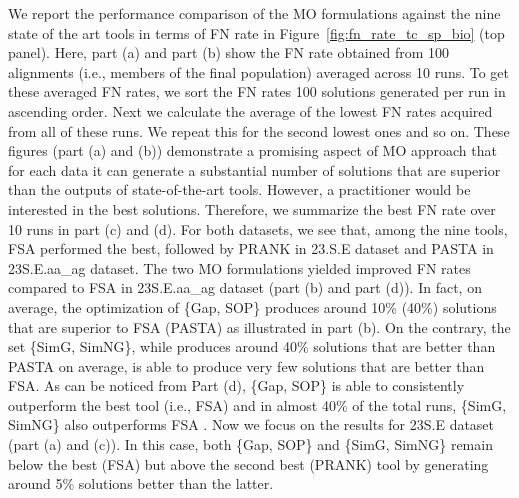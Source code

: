 We report the performance comparison of the MO formulations against the nine state of the art tools in terms of FN rate in Figure~\ref{fig:fn_rate_tc_sp_bio} (top panel). Here, part (a) and part (b) show the FN rate obtained from 100 alignments (i.e., members of the final population) averaged across 10 runs. To get these averaged FN rates, we sort the FN rates 100 solutions generated per run in ascending order. Next we calculate the average of the lowest FN rates acquired from all of these runs. We repeat this for the second lowest ones and so on. These figures (part (a) and (b)) demonstrate a promising aspect of MO approach that for each data it can generate a substantial number of solutions that are superior than the outputs of state-of-the-art tools. However, a practitioner would be interested in the best solutions. Therefore, we summarize the best FN rate over 10 runs in part (c) and (d). For both datasets, we see that, among the nine tools, FSA performed the best, followed by PRANK in 23.S.E dataset and PASTA in 23S.E.aa\_ag dataset. The two MO formulations yielded improved FN rates compared to FSA in 23S.E.aa\_ag dataset (part (b) and part (d)). In fact, on average, the optimization of \{Gap, SOP\} produces around 10\% (40\%) solutions that are superior to FSA (PASTA) as illustrated in part (b). On the contrary, the set \{SimG, SimNG\}, while produces around 40\% solutions that are better than PASTA on average, is able to produce very few solutions that are better than FSA. As can be noticed from Part (d), \{Gap, SOP\} is able to consistently outperform the best tool (i.e., FSA) and in almost 40\% of the total runs, \{SimG, SimNG\} also outperforms FSA . Now we focus on the results for 23S.E dataset (part (a) and (c)).  In this case, both \{Gap, SOP\} and \{SimG, SimNG\} remain below the best (FSA) but above the second best (PRANK) tool by generating around 5\% solutions better than the latter.


